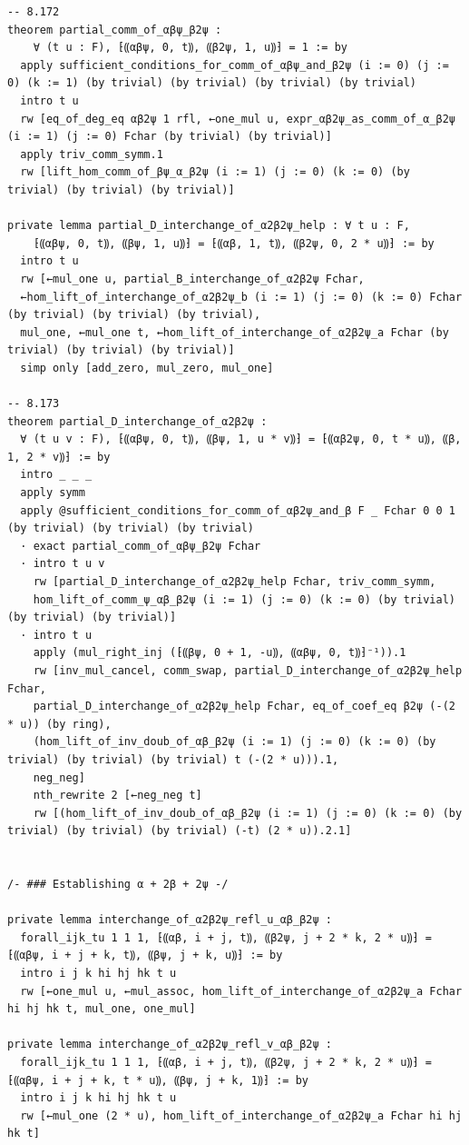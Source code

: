 \documentclass[10pt,a4paper]{article}
\begin{document}
\begin{Verbatim}
-- 8.172
theorem partial_comm_of_αβψ_β2ψ :
    ∀ (t u : F), ⁅⸨αβψ, 0, t⸩, ⸨β2ψ, 1, u⸩⁆ = 1 := by
  apply sufficient_conditions_for_comm_of_αβψ_and_β2ψ (i := 0) (j := 0) (k := 1) (by trivial) (by trivial) (by trivial) (by trivial)
  intro t u
  rw [eq_of_deg_eq αβ2ψ 1 rfl, ←one_mul u, expr_αβ2ψ_as_comm_of_α_β2ψ (i := 1) (j := 0) Fchar (by trivial) (by trivial)]
  apply triv_comm_symm.1
  rw [lift_hom_comm_of_βψ_α_β2ψ (i := 1) (j := 0) (k := 0) (by trivial) (by trivial) (by trivial)]

private lemma partial_D_interchange_of_α2β2ψ_help : ∀ t u : F,
    ⁅⸨αβψ, 0, t⸩, ⸨βψ, 1, u⸩⁆ = ⁅⸨αβ, 1, t⸩, ⸨β2ψ, 0, 2 * u⸩⁆ := by
  intro t u
  rw [←mul_one u, partial_B_interchange_of_α2β2ψ Fchar,
  ←hom_lift_of_interchange_of_α2β2ψ_b (i := 1) (j := 0) (k := 0) Fchar (by trivial) (by trivial) (by trivial),
  mul_one, ←mul_one t, ←hom_lift_of_interchange_of_α2β2ψ_a Fchar (by trivial) (by trivial) (by trivial)]
  simp only [add_zero, mul_zero, mul_one]

-- 8.173
theorem partial_D_interchange_of_α2β2ψ :
  ∀ (t u v : F), ⁅⸨αβψ, 0, t⸩, ⸨βψ, 1, u * v⸩⁆ = ⁅⸨αβ2ψ, 0, t * u⸩, ⸨β, 1, 2 * v⸩⁆ := by
  intro _ _ _
  apply symm
  apply @sufficient_conditions_for_comm_of_αβ2ψ_and_β F _ Fchar 0 0 1 (by trivial) (by trivial) (by trivial)
  · exact partial_comm_of_αβψ_β2ψ Fchar
  · intro t u v
    rw [partial_D_interchange_of_α2β2ψ_help Fchar, triv_comm_symm,
    hom_lift_of_comm_ψ_αβ_β2ψ (i := 1) (j := 0) (k := 0) (by trivial) (by trivial) (by trivial)]
  · intro t u
    apply (mul_right_inj (⁅⸨βψ, 0 + 1, -u⸩, ⸨αβψ, 0, t⸩⁆⁻¹)).1
    rw [inv_mul_cancel, comm_swap, partial_D_interchange_of_α2β2ψ_help Fchar,
    partial_D_interchange_of_α2β2ψ_help Fchar, eq_of_coef_eq β2ψ (-(2 * u)) (by ring),
    (hom_lift_of_inv_doub_of_αβ_β2ψ (i := 1) (j := 0) (k := 0) (by trivial) (by trivial) (by trivial) t (-(2 * u))).1,
    neg_neg]
    nth_rewrite 2 [←neg_neg t]
    rw [(hom_lift_of_inv_doub_of_αβ_β2ψ (i := 1) (j := 0) (k := 0) (by trivial) (by trivial) (by trivial) (-t) (2 * u)).2.1]


/- ### Establishing α + 2β + 2ψ -/

private lemma interchange_of_α2β2ψ_refl_u_αβ_β2ψ :
  forall_ijk_tu 1 1 1, ⁅⸨αβ, i + j, t⸩, ⸨β2ψ, j + 2 * k, 2 * u⸩⁆ = ⁅⸨αβψ, i + j + k, t⸩, ⸨βψ, j + k, u⸩⁆ := by
  intro i j k hi hj hk t u
  rw [←one_mul u, ←mul_assoc, hom_lift_of_interchange_of_α2β2ψ_a Fchar hi hj hk t, mul_one, one_mul]

private lemma interchange_of_α2β2ψ_refl_v_αβ_β2ψ :
  forall_ijk_tu 1 1 1, ⁅⸨αβ, i + j, t⸩, ⸨β2ψ, j + 2 * k, 2 * u⸩⁆ = ⁅⸨αβψ, i + j + k, t * u⸩, ⸨βψ, j + k, 1⸩⁆ := by
  intro i j k hi hj hk t u
  rw [←mul_one (2 * u), hom_lift_of_interchange_of_α2β2ψ_a Fchar hi hj hk t]


\end{Verbatim}
\end{document}
